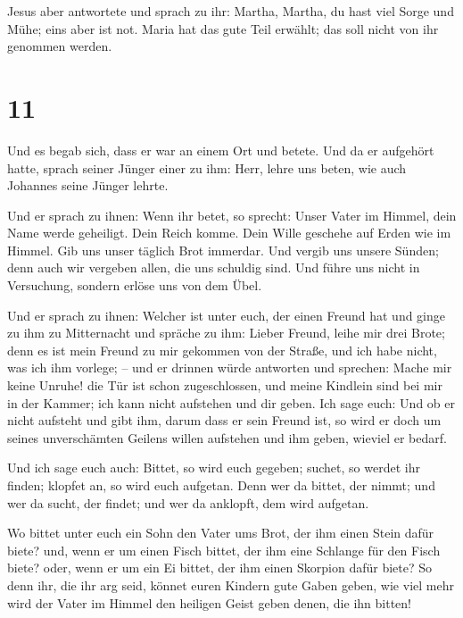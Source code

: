 Jesus aber antwortete und sprach zu ihr: Martha, Martha,
du hast viel Sorge und Mühe;  eins aber ist not. Maria
hat das gute Teil erwählt; das soll nicht von ihr genommen werden.

\hypertarget{section-10}{%
\section{11}\label{section-10}}

 Und es begab sich, dass er war an einem Ort und betete.
Und da er aufgehört hatte, sprach seiner Jünger einer zu ihm: Herr,
lehre uns beten, wie auch Johannes seine Jünger lehrte.

 Und er sprach zu ihnen: Wenn ihr betet, so sprecht: Unser
Vater im Himmel, dein Name werde geheiligt. Dein Reich komme. Dein Wille
geschehe auf Erden wie im Himmel.  Gib uns unser täglich
Brot immerdar.  Und vergib uns unsere Sünden; denn auch
wir vergeben allen, die uns schuldig sind. Und führe uns nicht in
Versuchung, sondern erlöse uns von dem Übel.

 Und er sprach zu ihnen: Welcher ist unter euch, der einen
Freund hat und ginge zu ihm zu Mitternacht und spräche zu ihm: Lieber
Freund, leihe mir drei Brote;  denn es ist mein Freund zu
mir gekommen von der Straße, und ich habe nicht, was ich ihm vorlege; --
 und er drinnen würde antworten und sprechen: Mache mir
keine Unruhe! die Tür ist schon zugeschlossen, und meine Kindlein sind
bei mir in der Kammer; ich kann nicht aufstehen und dir geben.
 Ich sage euch: Und ob er nicht aufsteht und gibt ihm,
darum dass er sein Freund ist, so wird er doch um seines unverschämten
Geilens willen aufstehen und ihm geben, wieviel er bedarf.

 Und ich sage euch auch: Bittet, so wird euch gegeben;
suchet, so werdet ihr finden; klopfet an, so wird euch aufgetan.
 Denn wer da bittet, der nimmt; und wer da sucht, der
findet; und wer da anklopft, dem wird aufgetan.

 Wo bittet unter euch ein Sohn den Vater ums Brot, der
ihm einen Stein dafür biete? und, wenn er um einen Fisch bittet, der ihm
eine Schlange für den Fisch biete?  oder, wenn er um ein
Ei bittet, der ihm einen Skorpion dafür biete?  So denn
ihr, die ihr arg seid, könnet euren Kindern gute Gaben geben, wie viel
mehr wird der Vater im Himmel den heiligen Geist geben denen, die ihn
bitten!

